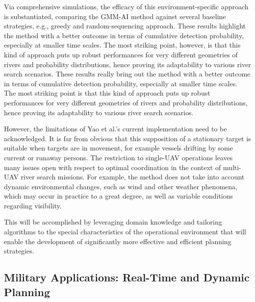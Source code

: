 \documentclass[conference]{IEEEtran}
\begin{document}
Via comprehensive simulations, the efficacy of this environment-specific approach is substantiated, comparing the GMM-AI method against several baseline strategies, e.g., greedy and random-sequencing approach. These results highlight the method with a better outcome in terms of cumulative detection probability, especially at smaller time scales. The most striking point, however, is that this kind of approach puts up robust performances for very different geometries of rivers and probability distributions, hence proving its adaptability to various river search scenarios. 
These results really bring out the method with a better outcome in terms of cumulative detection probability, especially at smaller time scales. The most striking point is that this kind of approach puts up robust performances for very different geometries of rivers and probability distributions, hence proving its adaptability to various river search scenarios.

However, the limitations of Yao et al.'s current implementation need to be acknowledged. It is far from obvious that this supposition of a stationary target is suitable when targets are in movement, for example vessels drifting by some current or runaway persons. The restriction to single-UAV operations leaves many issues open with respect to optimal coordination in the context of multi-UAV river search missions. For example, the method does not take into account dynamic environmental changes, such as wind and other weather phenomena, which may occur in practice to a great degree, as well as variable conditions regarding visibility.

This will be accomplished by leveraging domain knowledge and tailoring algorithms to the special characteristics of the operational environment that will enable the development of significantly more effective and efficient planning strategies.

\subsection{Military Applications: Real-Time and Dynamic Planning}
\end{document}
